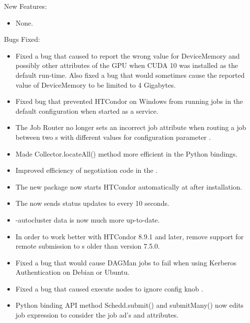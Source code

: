 \noindent New Features:

\begin{itemize}

\item None.

\end{itemize}

\noindent Bugs Fixed:

\begin{itemize}

\item Fixed a bug that caused  to report the wrong value
for DeviceMemory and possibly other attributes of the GPU when CUDA 10 was
installed as the default run-time.  Also fixed a bug that would sometimes cause
the reported value of DeviceMemory to be limited to 4 Gigabytes.

\item Fixed bug that prevented HTCondor on Windows from running jobs in the
default configuration when started as a service.

\item The Job Router no longer sets an incorrect  job
attribute when routing a job between two s with
different values for configuration parameter .

\item Made Collector.locateAll() method more efficient in the Python
bindings.

\item Improved efficiency of negotiation code in the .

\item The new  package now starts HTCondor automatically
at after installation.

\item The  now sends status updates to  every 10
seconds.

\item {} -autocluster data is now much more up-to-date.

\item In order to work better with HTCondor 8.9.1 and later, remove support
for remote submission to s older than version 7.5.0.

\item Fixed a bug that would cause DAGMan jobs to fail when using Kerberos Authentication on Debian or Ubuntu.

\item Fixed a bug that caused execute nodes to ignore config knob .

\item Python binding API method Schedd.submit() and submitMany() now edits job 
expression to consider the job ad's  and  attributes.

\end{itemize}

